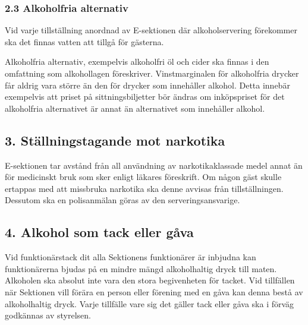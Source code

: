 \documentclass[10pt]{article}
\begin{document}
\subsubsection*{2.3 Alkoholfria alternativ}
Vid varje tillställning anordnad av E-sektionen där alkoholservering förekommer ska det finnas vatten att tillgå för gästerna.

Alkoholfria alternativ, exempelvis alkoholfri öl och cider ska finnas i den omfattning som alkohollagen föreskriver. Vinstmarginalen för alkoholfria drycker får aldrig vara större än den för drycker som innehåller alkohol. Detta innebär exempelvis att priset på sittningsbiljetter bör ändras om inköpspriset för det alkoholfria alternativet är annat än alternativet som innehåller alkohol.

\subsection*{3. Ställningstagande mot narkotika}
E-sektionen tar avstånd från all användning av narkotikaklassade medel annat än för medicinskt bruk som sker enligt läkares föreskrift. Om någon gäst skulle ertappas med att missbruka narkotika ska denne avvisas från tillställningen. Dessutom ska en polisanmälan göras av den serveringsansvarige.

\subsection*{4. Alkohol som tack eller gåva}
Vid funktionärstack dit alla Sektionens funktionärer är inbjudna kan funktionärerna bjudas på en mindre mängd alkoholhaltig dryck till maten. Alkoholen ska absolut inte vara den stora begivenheten för tacket. Vid tillfällen när Sektionen vill förära en person eller förening med en gåva kan denna bestå av alkoholhaltig dryck. Varje tillfälle vare sig det gäller tack eller gåva ska i förväg godkännas av styrelsen.
\end{document}
